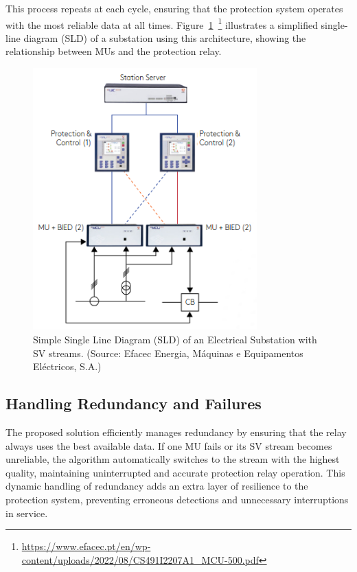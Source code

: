 This process repeats at each cycle, ensuring that the protection system operates with the most reliable data at all times. Figure~\ref{fig:SLD_Diagram}~\footnote{\url{https://www.efacec.pt/en/wp-content/uploads/2022/08/CS491I2207A1_MCU-500.pdf}} illustrates a simplified single-line diagram (SLD) of a substation using this architecture, showing the relationship between MUs and the protection relay.

\begin{figure}[tbh]
	\centering
	\includegraphics[width=0.77\textwidth, keepaspectratio]{ch3/assets/SLD_Diagram.png}
	\caption{Simple Single Line Diagram (SLD) of an Electrical Substation with SV streams. (Source: Efacec Energia, Máquinas e Equipamentos Eléctricos, S.A.)}
	\label{fig:SLD_Diagram}
\end{figure}

\subsection{Handling Redundancy and Failures}

The proposed solution efficiently manages redundancy by ensuring that the relay always uses the best available data. If one MU fails or its SV stream becomes unreliable, the algorithm automatically switches to the stream with the highest quality, maintaining uninterrupted and accurate protection relay operation. This dynamic handling of redundancy adds an extra layer of resilience to the protection system, preventing erroneous detections and unnecessary interruptions in service.

